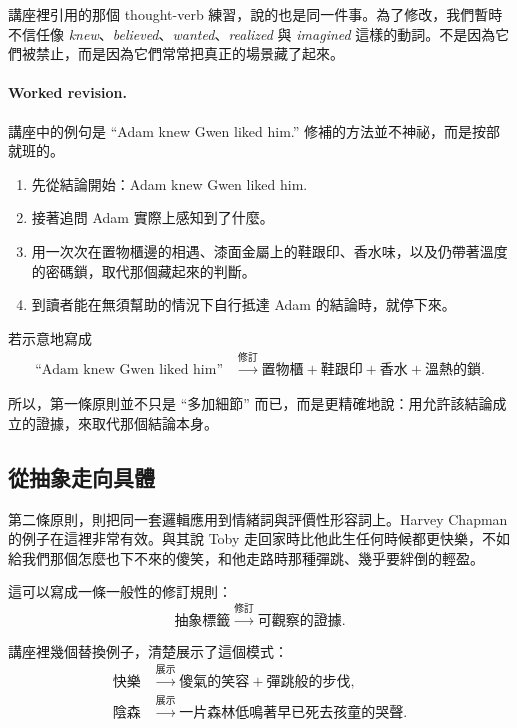 講座裡引用的那個 thought-verb 練習，說的也是同一件事。為了修改，我們暫時不信任像 \emph{knew}、\emph{believed}、\emph{wanted}、\emph{realized} 與 \emph{imagined} 這樣的動詞。不是因為它們被禁止，而是因為它們常常把真正的場景藏了起來。

\paragraph{Worked revision.} 講座中的例句是 ``Adam knew Gwen liked him.'' 修補的方法並不神祕，而是按部就班的。
\begin{enumerate}
\item 先從結論開始：Adam knew Gwen liked him.
\item 接著追問 Adam 實際上感知到了什麼。
\item 用一次次在置物櫃邊的相遇、漆面金屬上的鞋跟印、香水味，以及仍帶著溫度的密碼鎖，取代那個藏起來的判斷。
\item 到讀者能在無須幫助的情況下自行抵達 Adam 的結論時，就停下來。
\end{enumerate}

若示意地寫成
\begin{align}
\text{``Adam knew Gwen liked him''}
&\xrightarrow{\text{修訂}}
\text{置物櫃} + \text{鞋跟印} + \text{香水} + \text{溫熱的鎖}.
\end{align}

所以，第一條原則並不只是 ``多加細節'' 而已，而是更精確地說：用允許該結論成立的證據，來取代那個結論本身。

\subsection{從抽象走向具體}

第二條原則，則把同一套邏輯應用到情緒詞與評價性形容詞上。Harvey Chapman 的例子在這裡非常有效。與其說 Toby 走回家時比他此生任何時候都更快樂，不如給我們那個怎麼也下不來的傻笑，和他走路時那種彈跳、幾乎要絆倒的輕盈。

這可以寫成一條一般性的修訂規則：
\begin{equation}
\text{抽象標籤} \xrightarrow{\text{修訂}} \text{可觀察的證據}.
\end{equation}

講座裡幾個替換例子，清楚展示了這個模式：
\begin{align}
\text{快樂}
&\xrightarrow{\text{展示}}
\text{傻氣的笑容} + \text{彈跳般的步伐},\\
\text{陰森}
&\xrightarrow{\text{展示}}
\text{一片森林低鳴著早已死去孩童的哭聲}.
\end{align}

